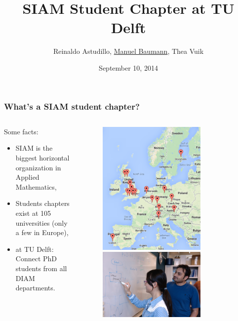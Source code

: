 \documentclass{beamer}
\title{\huge{SIAM Student Chapter at TU Delft}}
\author{Reinaldo Astudillo, \underline{Manuel Baumann}, Thea Vuik}
\date{\footnotesize{September 10, 2014}}
\begin{document}
\frame{\titlepage}
\begin{frame}
\frametitle{What's a SIAM student chapter?}
\begin{columns}
 \begin{column}{0.7\textwidth}
 Some facts:
 \begin{itemize}
  \item SIAM is the biggest horizontal organization in Applied Mathematics,
  \item Students chapters exist at 105 universities (only a few in Europe),
  \item at TU Delft: Connect PhD students from all DIAM departments.
 \end{itemize}

 \end{column}

 \begin{column}{0.4\textwidth}
  \begin{figure}[t]
  \centering
  \includegraphics[width=0.75\textwidth]{images/map} \vspace{0.6cm}\\
  \includegraphics[width=0.75\textwidth]{images/whiteboard1}
  \end{figure}
 \end{column}
 \end{columns}
\end{frame}
\end{document}
